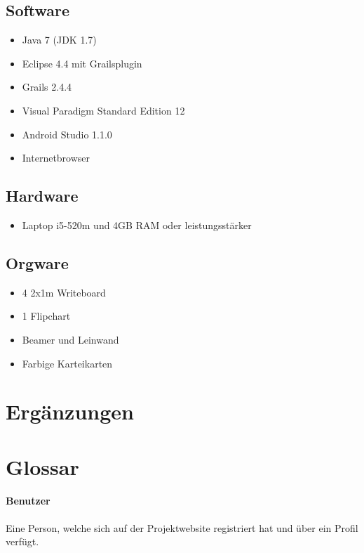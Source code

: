 \documentclass[10pt,a4paper]{article}
\begin{document}
\subsection{Software}
\begin{itemize}
	\item Java 7 (JDK 1.7)
	\item Eclipse 4.4 mit Grailsplugin
	\item Grails 2.4.4
	\item Visual Paradigm Standard Edition 12
	\item Android Studio 1.1.0
	\item Internetbrowser
\end{itemize}
\subsection{Hardware}
\begin{itemize}
	\item Laptop i5-520m und 4GB RAM oder leistungsst\"arker
\end{itemize}
\subsection{Orgware}
\begin{itemize}
	\item 4 2x1m Writeboard
	\item 1 Flipchart
	\item Beamer und Leinwand
	\item Farbige Karteikarten
\end{itemize}
\section{Erg\"anzungen}

\section{Glossar}

\paragraph{Benutzer} Eine Person, welche sich auf der Projektwebsite registriert hat und über ein Profil verfügt.
\end{document}
